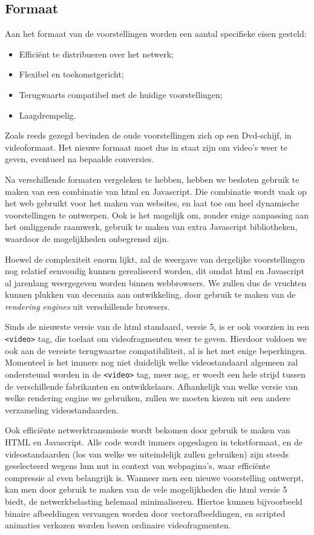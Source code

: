 \subsection{Formaat}

Aan het formaat van de voorstellingen worden een aantal specifieke eisen gesteld:
\begin{itemize}
\item Efficiënt te distribueren over het netwerk;
\item Flexibel en toekomstgericht;
\item Terugwaarts compatibel met de huidige voorstellingen;
\item Laagdrempelig.
\end{itemize}

Zoals reeds gezegd bevinden de oude voorstellingen zich op een Dvd-schijf, in videoformaat. Het nieuwe formaat moet dus in staat zijn om video's weer te geven, eventueel na bepaalde conversies.

Na verschillende formaten vergeleken te hebben, hebben we besloten gebruik te maken van een combinatie van \ac{html} en Javascript. Die combinatie wordt vaak op het web gebruikt voor het maken van websites, en laat toe om heel dynamische voorstellingen te ontwerpen. Ook is het mogelijk om, zonder enige aanpassing aan het omliggende raamwerk, gebruik te maken van extra Javascript bibliotheken, waardoor de mogelijkheden onbegrensd zijn.

Hoewel de complexiteit enorm lijkt, zal de weergave van dergelijke voorstellingen nog relatief eenvoudig kunnen gerealiseerd worden, dit omdat \ac{html} en Javascript al jarenlang weergegeven worden binnen webbrowsers. We zullen dus de vruchten kunnen plukken van decennia aan ontwikkeling, door gebruik te maken van de \emph{rendering engines} uit verschillende browsers.

Sinds de nieuwste versie van de \ac{html} standaard, versie 5, is er ook voorzien in een \texttt{<video>} tag, die toelaat om videofragmenten weer te geven. Hierdoor voldoen we ook aan de vereiste terugwaartse compatibiliteit, al is het met enige beperkingen. Momenteel is het immers nog niet duidelijk welke videostandaard algemeen zal ondersteund worden in de \texttt{<video>} tag, meer nog, er woedt een hele strijd tussen de verschillende fabrikanten en ontwikkelaars. Afhankelijk van welke versie van welke rendering engine we gebruiken, zullen we moeten kiezen uit een andere verzameling videostandaarden.

Ook efficiënte netwerktransmissie wordt bekomen door gebruik te maken van HTML en Javascript. Alle code wordt immers opgeslagen in tekstformaat, en de videostandaarden (los van welke we uiteindelijk zullen gebruiken) zijn steeds geselecteerd wegens hun nut in context van webpagina's, waar efficiënte compressie al even belangrijk is. Wanneer men een nieuwe voorstelling ontwerpt, kan men door gebruik te maken van de vele mogelijkheden die \ac{html} versie 5 biedt, de netwerkbelasting helemaal minimaliseren. Hiertoe kunnen bijvoorbeeld binaire afbeeldingen vervangen worden door vectorafbeeldingen, en scripted animaties verkozen worden boven ordinaire videofragmenten.


